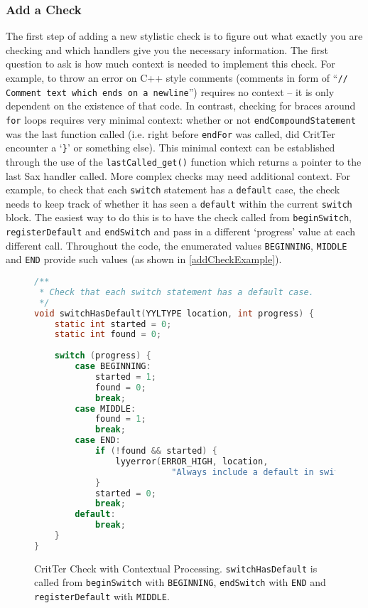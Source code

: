 \documentclass[12pt]{report}
\newcommand{\programName}{CritTer\xspace}
\begin{document}
\subsubsection{Add a Check}

The first step of adding a new stylistic check is to figure out what exactly you are checking and which 
handlers give you the necessary information. The first question to ask is how much context is needed to 
implement this check. For example, to throw an error on C++ style comments (comments in form of 
``\lstinline{// Comment text which ends on a newline}'') requires no context -- it is only dependent on the 
existence of that code. In contrast, checking for braces around \lstinline{for} loops requires very minimal 
context: whether or not \lstinline{endCompoundStatement} was the last function called (i.e. right before 
\lstinline{endFor} was called, did \programName encounter a `\lstinline!}!' or something else). This 
minimal context can be established through the use of the \lstinline{lastCalled_get()} function which 
returns a pointer to the last Sax handler called. More complex checks may need additional context. For 
example, to check that each \lstinline{switch} statement has a \lstinline{default} case, the check needs to 
keep track of whether it has seen a \lstinline{default} within the current \lstinline{switch} block. The 
easiest way to do this is to have the check called from \lstinline{beginSwitch}, \lstinline{registerDefault} 
and \lstinline{endSwitch} and pass in a different `progress' value at each different call. Throughout the 
code, the enumerated values \lstinline{BEGINNING}, \lstinline{MIDDLE} and \lstinline{END} provide such 
values (as shown in \autoref{addCheckExample}).

\begin{figure}
\begin{lstlisting}[language=C]
/**
 * Check that each switch statement has a default case.
 */
void switchHasDefault(YYLTYPE location, int progress) {
	static int started = 0;
	static int found = 0;
	
	switch (progress) {
		case BEGINNING:
			started = 1;
			found = 0;
			break;
		case MIDDLE:
			found = 1;
			break;
		case END:
			if (!found && started) {
				lyyerror(ERROR_HIGH, location, 
					       "Always include a default in switch statements");
			}
			started = 0;
			break;
		default: 
			break;
	}
}
\end{lstlisting}
\caption[\programName Check with Contextual Processing]{\programName Check with Contextual Processing. \lstinline{switchHasDefault} is called from \lstinline{beginSwitch} with \lstinline{BEGINNING}, \lstinline{endSwitch} with \lstinline{END} and \lstinline{registerDefault} with \lstinline{MIDDLE}.}
\label{addCheckExample}
\end{figure}
\end{document}
